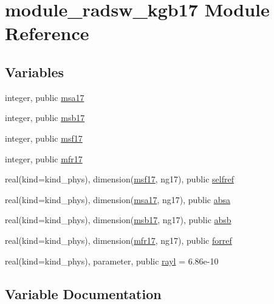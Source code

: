 \hypertarget{namespacemodule__radsw__kgb17}{}\section{module\+\_\+radsw\+\_\+kgb17 Module Reference}
\label{namespacemodule__radsw__kgb17}
\subsection*{Variables}
\begin{DoxyCompactItemize}
\item 
integer, public \hyperlink{namespacemodule__radsw__kgb17_ac139ff93555c22e658cb767fa7142e08}{msa17}
\item 
integer, public \hyperlink{group__module__radsw__main_gafbb056103147b8e5f4d5a8af40420ea0}{msb17}
\item 
integer, public \hyperlink{group__module__radsw__main_ga6864c3b95515fb2f408e21298da3952f}{msf17}
\item 
integer, public \hyperlink{group__module__radsw__main_gadd099d7e1b5e7767d77de6d96673e26f}{mfr17}
\item 
real(kind=kind\+\_\+phys), dimension(\hyperlink{group__module__radsw__main_ga6864c3b95515fb2f408e21298da3952f}{msf17}, ng17), public \hyperlink{group__module__radsw__main_gaade34dfbe8c5f380088b6e03acc727c9}{selfref}
\item 
real(kind=kind\+\_\+phys), dimension(\hyperlink{namespacemodule__radsw__kgb17_ac139ff93555c22e658cb767fa7142e08}{msa17}, ng17), public \hyperlink{group__module__radsw__main_ga19083764c3dfe437282b032517baf3ed}{absa}
\item 
real(kind=kind\+\_\+phys), dimension(\hyperlink{group__module__radsw__main_gafbb056103147b8e5f4d5a8af40420ea0}{msb17}, ng17), public \hyperlink{group__module__radsw__main_gaef407d13a88f5e1bfd20652ab3010e2f}{absb}
\item 
real(kind=kind\+\_\+phys), dimension(\hyperlink{group__module__radsw__main_gadd099d7e1b5e7767d77de6d96673e26f}{mfr17}, ng17), public \hyperlink{group__module__radsw__main_ga5041a137ba35dca9a767ce854748dd49}{forref}
\item 
real(kind=kind\+\_\+phys), parameter, public \hyperlink{group__module__radsw__main_gaa4862628a06e0e08d1db5637bc62ffa5}{rayl} = 6.\+86e-\/10
\end{DoxyCompactItemize}


\subsection{Variable Documentation}
